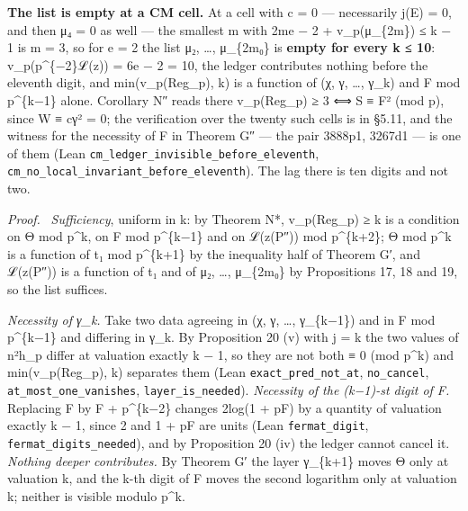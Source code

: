 \documentclass[11pt,a4paper]{article}
\theoremstyle{named}
\newenvironment{mdproof}[1][Proof]{\par\medskip\noindent\textit{#1.}\ }{\par\medskip}
\begin{document}
\textbf{The list is empty at a CM cell.} At a cell with c = 0 — necessarily j(E) = 0, and then μ₄ = 0 as well — the smallest m with 2me − 2 + v\_p(μ\_\{2m\}) ≤ k − 1 is m = 3, so for e = 2 the list μ₂, …, μ\_\{2m₀\} is \textbf{empty for every k ≤ 10}: v\_p(p\textasciicircum{}\{−2\}ℒ(z)) = 6e − 2 = 10, the ledger contributes nothing before the eleventh digit, and min(v\_p(Reg\_p), k) is a function of (χ, γ, …, γ\_k) and F mod p\textasciicircum{}\{k−1\} alone. Corollary N″ reads there v\_p(Reg\_p) ≥ 3 ⟺ S ≡ F² (mod p), since W ≡ cγ² = 0; the verification over the twenty such cells is in §5.11, and the witness for the necessity of F in Theorem G″ — the pair 3888p1, 3267d1 — is one of them (Lean \texttt{cm\_\allowbreak{}ledger\_\allowbreak{}invisible\_\allowbreak{}before\_\allowbreak{}eleventh}, \texttt{cm\_\allowbreak{}no\_\allowbreak{}local\_\allowbreak{}invariant\_\allowbreak{}before\_\allowbreak{}eleventh}). The lag there is ten digits and not two.

\begin{mdproof}[Proof]
\textit{Sufficiency}, uniform in k: by Theorem N*, v\_p(Reg\_p) ≥ k is a condition on Θ mod p\textasciicircum{}k, on F mod p\textasciicircum{}\{k−1\} and on ℒ(z(P″)) mod p\textasciicircum{}\{k+2\}; Θ mod p\textasciicircum{}k is a function of t₁ mod p\textasciicircum{}\{k+1\} by the inequality half of Theorem G′, and ℒ(z(P″)) is a function of t₁ and of μ₂, …, μ\_\{2m₀\} by Propositions 17, 18 and 19, so the list suffices.
\end{mdproof}

\textit{Necessity of γ\_k.} Take two data agreeing in (χ, γ, …, γ\_\{k−1\}) and in F mod p\textasciicircum{}\{k−1\} and differing in γ\_k. By Proposition 20 (v) with j = k the two values of n²h\_p differ at valuation exactly k − 1, so they are not both ≡ 0 (mod p\textasciicircum{}k) and min(v\_p(Reg\_p), k) separates them (Lean \texttt{exact\_\allowbreak{}pred\_\allowbreak{}not\_\allowbreak{}at}, \texttt{no\_\allowbreak{}cancel}, \texttt{at\_\allowbreak{}most\_\allowbreak{}one\_\allowbreak{}vanishes}, \texttt{layer\_\allowbreak{}is\_\allowbreak{}needed}). \textit{Necessity of the (k−1)-st digit of F.} Replacing F by F + p\textasciicircum{}\{k−2\} changes 2log(1 + pF) by a quantity of valuation exactly k − 1, since 2 and 1 + pF are units (Lean \texttt{fermat\_\allowbreak{}digit}, \texttt{fermat\_\allowbreak{}digits\_\allowbreak{}needed}), and by Proposition 20 (iv) the ledger cannot cancel it. \textit{Nothing deeper contributes.} By Theorem G′ the layer γ\_\{k+1\} moves Θ only at valuation k, and the k-th digit of F moves the second logarithm only at valuation k; neither is visible modulo p\textasciicircum{}k.
\end{document}
